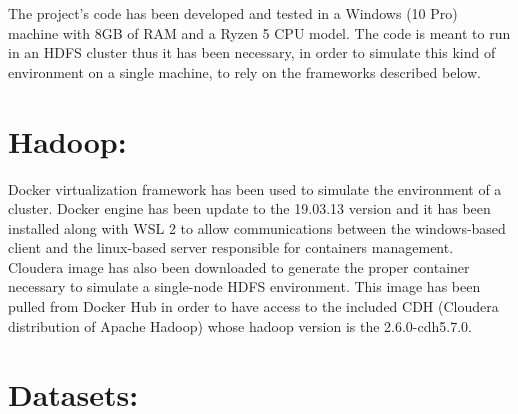 \documentclass[]{report}
\begin{document}
	The project's code has been developed and tested in a Windows (10 Pro) machine with 8GB of RAM and a Ryzen 5 CPU model. The code is meant to run in an HDFS cluster thus it has been necessary, in order to simulate this kind of environment on a single machine, to rely on the frameworks described below.   

\section*{Hadoop:}

	Docker virtualization framework has been used to simulate the environment of a cluster. Docker engine has been update to the 19.03.13 version and it has been installed along with WSL 2 to allow communications between the windows-based client and the linux-based server responsible for containers management. Cloudera image has also been downloaded to generate the proper container necessary to simulate a single-node HDFS environment. This image has been pulled from Docker Hub in order to have access to the included CDH (Cloudera distribution of Apache Hadoop) whose hadoop version is the 2.6.0-cdh5.7.0.

\section*{Datasets:}
\end{document}
